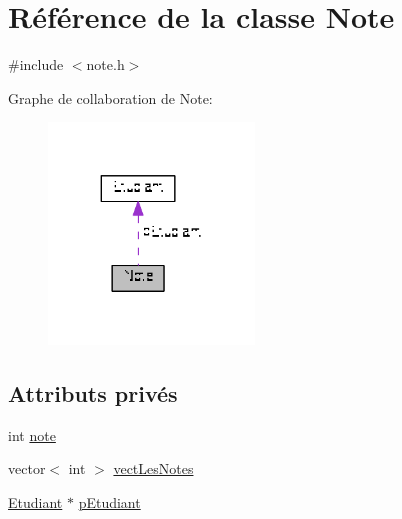 \hypertarget{class_note}{\section{Référence de la classe Note}
\label{class_note}
}


{\ttfamily \#include $<$note.\+h$>$}



Graphe de collaboration de Note\+:\nopagebreak
\begin{figure}[H]
\begin{center}
\leavevmode
\includegraphics[width=155pt]{class_note__coll__graph}
\end{center}
\end{figure}
\subsection*{Attributs privés}
\begin{DoxyCompactItemize}
\item 
int \hyperlink{class_note_a3cb5f22dd5374f4e3c59c5f11dc7fbfb}{note}
\item 
vector$<$ int $>$ \hyperlink{class_note_a1e3b69349068565dc35fcae867145892}{vect\+Les\+Notes}
\item 
\hyperlink{class_etudiant}{Etudiant} $\ast$ \hyperlink{class_note_a3ceec90c97d49215fe0eaa33e92a83d2}{p\+Etudiant}
\end{DoxyCompactItemize}


